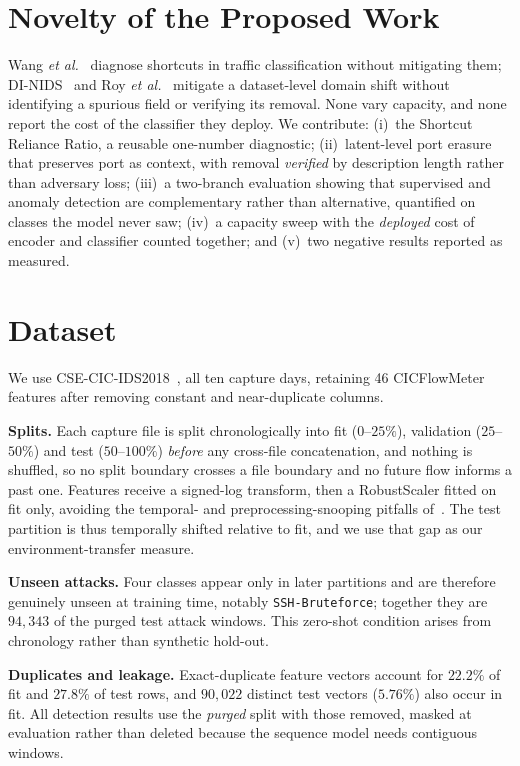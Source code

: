 \documentclass[conference]{IEEEtran}
\begin{document}
\section{Novelty of the Proposed Work}\label{sec:novelty}
Wang \emph{et al.}~\cite{wang2026bias} diagnose shortcuts in traffic classification without
mitigating them; DI-NIDS~\cite{layeghy2022dinids} and Roy \emph{et
al.}~\cite{roy2023domaininvariant} mitigate a dataset-level domain shift without identifying
a spurious field or verifying its removal. None vary capacity, and none report the cost of
the classifier they deploy. We contribute: (i)~the Shortcut Reliance Ratio, a reusable
one-number diagnostic; (ii)~latent-level port erasure that preserves port as context, with
removal \emph{verified} by description length rather than adversary loss; (iii)~a two-branch
evaluation showing that supervised and anomaly detection are complementary rather than
alternative, quantified on classes the model never saw; (iv)~a capacity sweep with the
\emph{deployed} cost of encoder and classifier counted together; and (v)~two negative
results reported as measured.

\section{Dataset}\label{sec:dataset}
We use CSE-CIC-IDS2018~\cite{sharafaldin2018toward}, all ten capture days, retaining 46
CICFlowMeter features after removing constant and near-duplicate columns.

\textbf{Splits.} Each capture file is split chronologically into fit ($0$--$25\%$),
validation ($25$--$50\%$) and test ($50$--$100\%$) \emph{before} any cross-file
concatenation, and nothing is shuffled, so no split boundary crosses a file boundary and no
future flow informs a past one. Features receive a signed-log transform, then a RobustScaler
fitted on fit only, avoiding the temporal- and preprocessing-snooping pitfalls
of~\cite{arp2022dos}. The test partition is thus temporally shifted relative to fit, and we
use that gap as our environment-transfer measure.

\textbf{Unseen attacks.} Four classes appear only in later partitions and are therefore
genuinely unseen at training time, notably \texttt{SSH-Bruteforce}; together they are
$94{,}343$ of the purged test attack windows. This zero-shot condition arises from
chronology rather than synthetic hold-out.

\textbf{Duplicates and leakage.} Exact-duplicate feature vectors account for $22.2\%$ of fit
and $27.8\%$ of test rows, and $90{,}022$ distinct test vectors ($5.76\%$) also occur in fit.
All detection results use the \emph{purged} split with those removed, masked at evaluation
rather than deleted because the sequence model needs contiguous windows.
\end{document}
